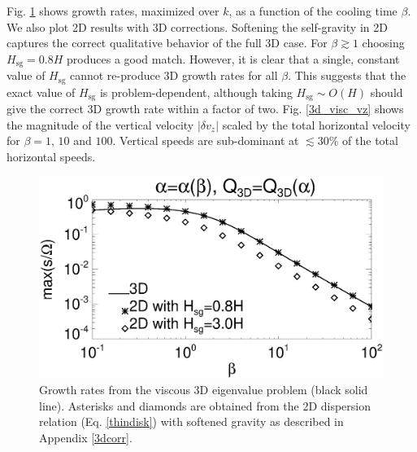 Fig. \ref{3d_visc} shows growth rates, maximized over $k$, as a
function of the cooling time $\beta$. We also plot 2D results with 3D
corrections. Softening the self-gravity in 2D captures the correct 
qualitative behavior of the full 3D case. For $\beta\gtrsim 1$
choosing $H_\mathrm{sg}=0.8H$ produces a good match. However, it is
clear that a single, constant value of $H_\mathrm{sg}$ cannot
re-produce 3D growth rates for all $\beta$. This suggests that the
exact value of $H_\mathrm{sg}$ is problem-dependent, although taking 
$H_\mathrm{sg}\sim O(H)$ should give the correct 3D growth rate within 
a factor of two. 
Fig. \ref{3d_visc_vz} shows the magnitude of the vertical velocity
$|\delta v_z|$ scaled by the total horizontal velocity for $\beta =
1,\,10$ and $100$. Vertical speeds are sub-dominant at $\lesssim 30\%$
of the total horizontal speeds. 

\begin{figure}
  \includegraphics[width=\linewidth,clip=true,trim=0cm 0.cm 0.cm
    0.0cm]{figures/growth_visc3d}
  \caption{Growth rates from the viscous 3D eigenvalue problem (black solid
    line). Asterisks and diamonds are obtained from the 2D dispersion
    relation (Eq. \ref{thindisk}) with softened gravity as described
    in Appendix \ref{3dcorr}. \label{3d_visc}} 
\end{figure}



